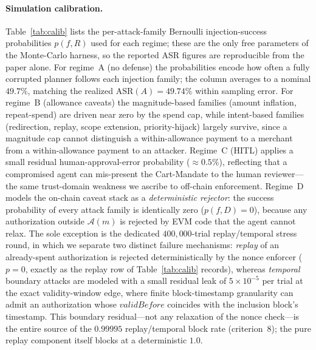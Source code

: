 \documentclass[10pt,twocolumn,letterpaper]{article}
\begin{document}
\paragraph{Simulation calibration.} Table~\ref{tab:calib} lists the per-attack-family Bernoulli injection-success probabilities $p(f,R)$ used for each regime; these are the only free parameters of the Monte-Carlo harness, so the reported ASR figures are reproducible from the paper alone. For regime~A (no defense) the probabilities encode how often a fully corrupted planner follows each injection family; the column averages to a nominal $49.7\%$, matching the realized $\mathrm{ASR}(A)=49.74\%$ within sampling error. For regime~B (allowance caveats) the magnitude-based families (amount inflation, repeat-spend) are driven near zero by the spend cap, while intent-based families (redirection, replay, scope extension, priority-hijack) largely survive, since a magnitude cap cannot distinguish a within-allowance payment to a merchant from a within-allowance payment to an attacker. Regime~C (HITL) applies a small residual human-approval-error probability ($\approx0.5\%$), reflecting that a compromised agent can mis-present the Cart-Mandate to the human reviewer---the same trust-domain weakness we ascribe to off-chain enforcement. Regime~D models the on-chain caveat stack as a \emph{deterministic rejector}: the success probability of every attack family is identically zero ($p(f,D)=0$), because any authorization outside $\mathcal{A}(m)$ is rejected by EVM code that the agent cannot relax. The sole exception is the dedicated $400{,}000$-trial replay/temporal stress round, in which we separate two distinct failure mechanisms: \emph{replay} of an already-spent authorization is rejected deterministically by the nonce enforcer ($p=0$, exactly as the replay row of Table~\ref{tab:calib} records), whereas \emph{temporal} boundary attacks are modeled with a small residual leak of $5\times10^{-5}$ per trial at the exact validity-window edge, where finite block-timestamp granularity can admit an authorization whose $\textit{validBefore}$ coincides with the inclusion block's timestamp. This boundary residual---not any relaxation of the nonce check---is the entire source of the $0.99995$ replay/temporal block rate (criterion~8); the pure replay component itself blocks at a deterministic $1.0$.
\end{document}
